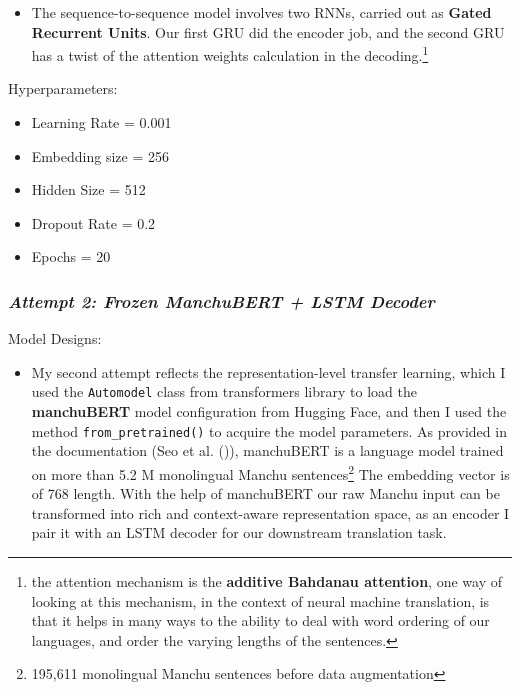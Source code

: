 \documentclass[
  letterpaper,
  DIV=11,
  numbers=noendperiod]{scrartcl}
\providecommand{\tightlist}{%
  \setlength{\itemsep}{0pt}\setlength{\parskip}{0pt}}\usepackage{longtable,booktabs,array}
\begin{document}
\begin{itemize}
\tightlist
\item
  The sequence-to-sequence model involves two RNNs, carried out as
  \textbf{Gated Recurrent Units}. Our first GRU did the encoder job, and
  the second GRU has a twist of the attention weights calculation in the
  decoding.\footnote{the attention mechanism is the \textbf{additive
    Bahdanau attention}, one way of looking at this mechanism, in the
    context of neural machine translation, is that it helps in many ways
    to the ability to deal with word ordering of our languages, and
    order the varying lengths of the sentences.}
\end{itemize}

Hyperparameters:

\begin{itemize}
\tightlist
\item
  Learning Rate = 0.001
\item
  Embedding size = 256
\item
  Hidden Size = 512
\item
  Dropout Rate = 0.2
\item
  Epochs = 20
\end{itemize}

\subsubsection{\texorpdfstring{\emph{Attempt 2: Frozen ManchuBERT + LSTM
Decoder}}{Attempt 2: Frozen ManchuBERT + LSTM Decoder}}\label{attempt-2-frozen-manchubert-lstm-decoder}

Model Designs:

\begin{itemize}
\tightlist
\item
  My second attempt reflects the representation-level transfer learning,
  which I used the \texttt{Automodel} class from transformers library to
  load the \textbf{manchuBERT} model configuration from Hugging Face,
  and then I used the method \texttt{from\_pretrained()} to acquire the
  model parameters. As provided in the documentation (Seo et al.
  ()), manchuBERT is
  a language model trained on more than 5.2 M monolingual Manchu
  sentences\footnote{195,611 monolingual Manchu sentences before data
    augmentation} The embedding vector is of 768 length. With the help
  of manchuBERT our raw Manchu input can be transformed into rich and
  context-aware representation space, as an encoder I pair it with an
  LSTM decoder for our downstream translation task.
\end{itemize}
\end{document}
